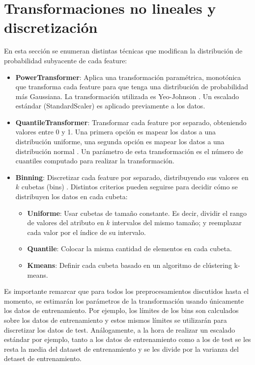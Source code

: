 \section { Transformaciones no lineales y discretización}

En esta sección se enumeran distintas técnicas que modifican la distribución de probabilidad subyacente de cada feature:

\begin{itemize}

\item \textbf{PowerTransformer}: Aplica una transformación paramétrica, monotónica que transforma cada feature para que tenga una distribución de probabilidad más Gaussiana. La transformación utilizada es  Yeo-Johnson \cite{yeo}. Un escalado estándar (StandardScaler) es aplicado previamente a los datos.

\item \textbf {QuantileTransformer}: Transformar cada feature por separado, obteniendo valores entre 0 y 1. Una primera opción es mapear los datos a una distribución uniforme, una segunda opción es mapear los datos a una distribución normal \cite{KRZYSZTOFOWICZ1997286}. Un parámetro de esta transformación es el número de cuantiles computado para realizar la transformación.

\item \textbf {Binning}: Discretizar cada feature por separado, distribuyendo sus valores en $k$ cubetas (bins) \cite{han2012mining}. Distintos criterios pueden seguirse para decidir cómo se distribuyen los datos en cada cubeta:
\begin{itemize}
\item \textbf{Uniforme}: Usar cubetas de tamaño constante. Es decir, dividir el rango de valores del atributo en $k$ intervalos del mismo tamaño; y reemplazar cada valor por el índice de su intervalo.
\item \textbf{Quantile}: Colocar la misma cantidad de elementos en cada cubeta.
\item \textbf{Kmeans}: Definir cada cubeta basado en un algoritmo de clústering k-means. 
\end{itemize}
\end{itemize}


Es importante remarcar que para todos los preprocesamientos discutidos hasta el momento, se estimarán los parámetros de la transformación usando únicamente los datos de entrenamiento. Por ejemplo, los límites de los bins son calculados sobre los datos de entrenamiento y estos mismos límites se utilizarán para discretizar los datos de test. Análogamente, a la hora de realizar un escalado estándar por ejemplo, tanto a los datos de entrenamiento como a los de test se les resta la media del dataset de entrenamiento y se les divide por la varianza del detaset de entrenamiento.

